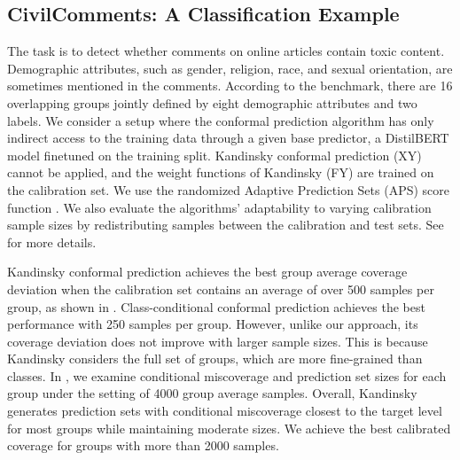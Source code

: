 \subsection{CivilComments: A Classification Example}
The task is to detect whether comments on online articles contain toxic content.  Demographic attributes, such as gender, religion, race, and sexual orientation, are sometimes mentioned in the comments. According to the \citet{Koh21} benchmark, there are 16 overlapping groups jointly defined by eight demographic attributes and two labels. We consider a setup where the conformal prediction algorithm has only indirect access to the training data through a given base predictor, a DistilBERT model finetuned on the training split. Kandinsky conformal prediction (XY) cannot be applied, and the weight functions of Kandinsky (FY) are trained on the calibration set. We use the randomized Adaptive Prediction Sets (APS) score function \citep{RSC20,DABJT23}. We also evaluate the algorithms’ adaptability to varying calibration sample sizes by redistributing samples between the calibration and test sets. See  for more details.

Kandinsky conformal prediction achieves the best group average coverage deviation when the calibration set contains an average of over 500 samples per group, as shown in . Class-conditional conformal prediction achieves the best performance with 250 samples per group. However, unlike our approach, its coverage deviation does not improve with larger sample sizes. This is because Kandinsky considers the full set of groups, which are more fine-grained than classes. In , we examine conditional miscoverage and prediction set sizes for each group under the setting of 4000 group average samples. Overall, Kandinsky generates prediction sets with conditional miscoverage closest to the target level for most groups while maintaining moderate sizes. We achieve the best calibrated coverage for groups with more than 2000 samples.





